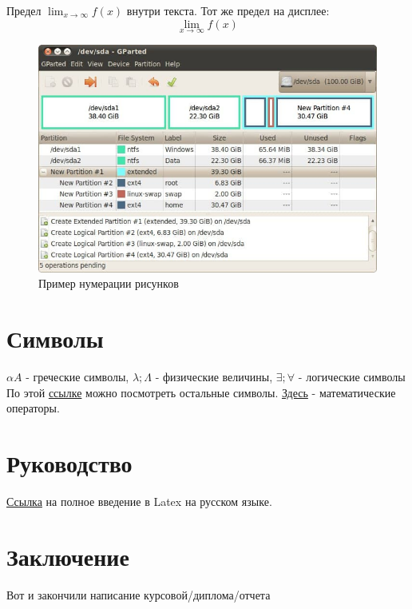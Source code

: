     Предел \(\lim_{x\to\infty} f(x)\) внутри текста.
    Тот же предел на дисплее:
    \[
    \lim_{x\to\infty} f(x)
    \]
\begin{figure}[!htb]
	\centering
	\includegraphics[width=\textwidth]{Images/image2.jpg}
	\caption{Пример нумерации рисунков}
	\label{fig:image2}
\end{figure}

\section{Символы}
$\alpha A$ - греческие символы,  $ \lambda; \Lambda$ - физические величины, $\exists; \forall$ - логические символы\\
По этой   \href{https://www.overleaf.com/learn/latex/List_of_Greek_letters_and_math_symbols}{ссылке} можно посмотреть остальные символы. \href{https://www.overleaf.com/learn/latex/Operators}{Здесь} - математические операторы.



\section{Руководство}
\href{https://www.texlive.info/CTAN/info/lshort/russian/lshortru.pdf}{Ссылка} на полное введение в Latex на русском языке.


\newpage
\section{Заключение}
Вот и закончили написание курсовой/диплома/отчета


